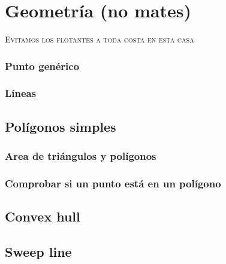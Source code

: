 \chapter{Geometría (no mates)}
\textsc{Evitamos los flotantes a toda costa en esta casa}
\subsection{Punto genérico}

\subsection{Líneas}

\section{Polígonos simples}
\subsection{Area de triángulos y polígonos}

\subsection{Comprobar si un punto está en un polígono}


\section{Convex hull}

\section{Sweep line}
